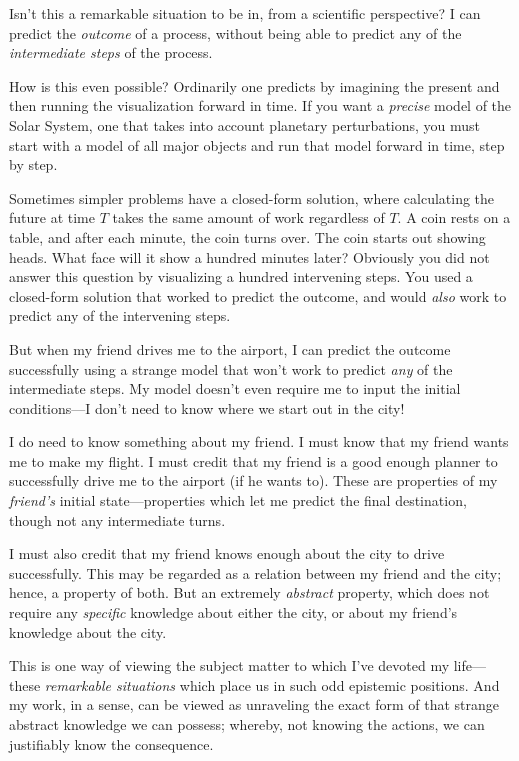 {
 Isn't this a remarkable situation to be in, from a
scientific perspective? I can predict the \textit{outcome} of a
process, without being able to predict any of the \textit{intermediate
steps} of the process.}

{
 How is this even possible? Ordinarily one predicts by imagining
the present and then running the visualization forward in time. If you
want a \textit{precise} model of the Solar System, one that takes into
account planetary perturbations, you must start with a model of all
major objects and run that model forward in time, step by step.}

{
 Sometimes simpler problems have a closed-form solution, where
calculating the future at time $T$ takes the same amount of work
regardless of $T$\@. A coin rests on a table, and after each minute, the
coin turns over. The coin starts out showing heads. What face will it
show a hundred minutes later? Obviously you did not answer this
question by visualizing a hundred intervening steps. You used a
closed-form solution that worked to predict the outcome, and would
\textit{also} work to predict any of the intervening steps.}

{
 But when my friend drives me to the airport, I can predict the
outcome successfully using a strange model that won't
work to predict \textit{any} of the intermediate steps. My model
doesn't even require me to input the initial
conditions---I don't need to know where we start out in
the city!}

{
 I do need to know something about my friend. I must know that my
friend wants me to make my flight. I must credit that my friend is a
good enough planner to successfully drive me to the airport (if he
wants to). These are properties of my \textit{friend's}
initial state---properties which let me predict the final destination,
though not any intermediate turns.}

{
 I must also credit that my friend knows enough about the city to
drive successfully. This may be regarded as a relation between my
friend and the city; hence, a property of both. But an extremely
\textit{abstract} property, which does not require any
\textit{specific} knowledge about either the city, or about my
friend's knowledge about the city.}

{
 This is one way of viewing the subject matter to which
I've devoted my life---these \textit{remarkable
situations} which place us in such odd epistemic positions. And my
work, in a sense, can be viewed as unraveling the exact form of that
strange abstract knowledge we can possess; whereby, not knowing the
actions, we can justifiably know the consequence.}

